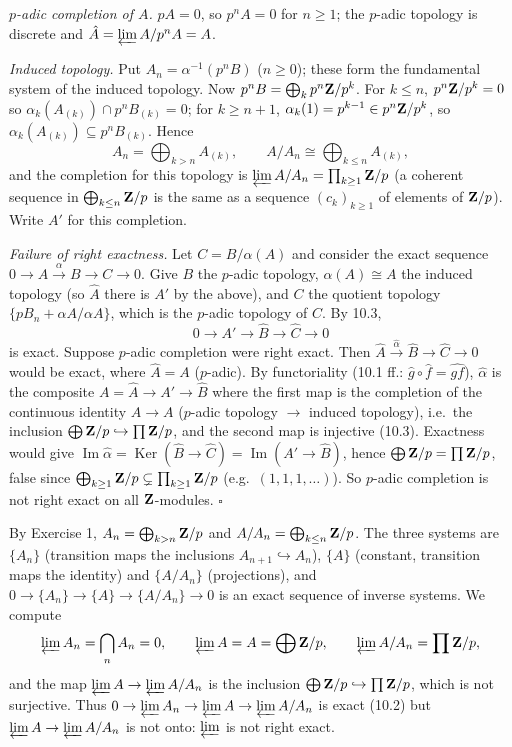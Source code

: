 \documentclass[11pt]{article}
\begin{document}
\emph{$p$-adic completion of $A$.} $pA=0$, so $p^nA=0$ for $n\ge1$; the $p$-adic topology is discrete and $\hat A=\varprojlim A/p^nA=A$.

\emph{Induced topology.} Put $A_n=\alpha^{-1}(p^nB)$ ($n\ge0$); these form the fundamental system of the induced topology. Now $p^nB=\bigoplus_kp^n\mathbf Z/p^k$. For $k\le n$, $p^n\mathbf Z/p^k=0$ so $\alpha_k(A_{(k)})\cap p^nB_{(k)}=0$; for $k\ge n+1$, $\alpha_k(1)=p^{k-1}\in p^n\mathbf Z/p^k$, so $\alpha_k(A_{(k)})\subseteq p^nB_{(k)}$. Hence
\[
A_n=\bigoplus_{k>n}A_{(k)},\qquad A/A_n\cong\bigoplus_{k\le n}A_{(k)},
\]
and the completion for this topology is $\varprojlim A/A_n=\prod_{k\ge1}\mathbf Z/p$ (a coherent sequence in $\bigoplus_{k\le n}\mathbf Z/p$ is the same as a sequence $(c_k)_{k\ge1}$ of elements of $\mathbf Z/p$). Write $A'$ for this completion.

\emph{Failure of right exactness.} Let $C=B/\alpha(A)$ and consider the exact sequence $0\to A\xrightarrow{\alpha}B\to C\to0$. Give $B$ the $p$-adic topology, $\alpha(A)\cong A$ the induced topology (so $\hat{A}$ there is $A'$ by the above), and $C$ the quotient topology $\{pB_n+\alpha A/\alpha A\}$, which is the $p$-adic topology of $C$. By 10.3,
\[
0\to A'\to\hat B\to\hat C\to0
\]
is exact. Suppose $p$-adic completion were right exact. Then $\hat A\xrightarrow{\hat\alpha}\hat B\to\hat C\to0$ would be exact, where $\hat A=A$ ($p$-adic). By functoriality (10.1 ff.: $\hat g\circ\hat f=\widehat{gf}$), $\hat\alpha$ is the composite $A=\hat A\to A'\to\hat B$ where the first map is the completion of the continuous identity $A\to A$ ($p$-adic topology $\to$ induced topology), i.e.\ the inclusion $\bigoplus\mathbf Z/p\hookrightarrow\prod\mathbf Z/p$, and the second map is injective (10.3). Exactness would give $\operatorname{Im}\hat\alpha=\operatorname{Ker}(\hat B\to\hat C)=\operatorname{Im}(A'\to\hat B)$, hence $\bigoplus\mathbf Z/p=\prod\mathbf Z/p$, false since $\bigoplus_{k\ge1}\mathbf Z/p\subsetneq\prod_{k\ge1}\mathbf Z/p$ (e.g.\ $(1,1,1,\dots)$). So $p$-adic completion is not right exact on all $\mathbf Z$-modules. \hfill$\square$

\pf
By Exercise 1, $A_n=\bigoplus_{k>n}\mathbf Z/p$ and $A/A_n=\bigoplus_{k\le n}\mathbf Z/p$. The three systems are $\{A_n\}$ (transition maps the inclusions $A_{n+1}\hookrightarrow A_n$), $\{A\}$ (constant, transition maps the identity) and $\{A/A_n\}$ (projections), and $0\to\{A_n\}\to\{A\}\to\{A/A_n\}\to0$ is an exact sequence of inverse systems. We compute
\[
\varprojlim A_n=\bigcap_nA_n=0,\qquad\varprojlim A=A=\bigoplus\mathbf Z/p,\qquad\varprojlim A/A_n=\prod\mathbf Z/p,
\]
and the map $\varprojlim A\to\varprojlim A/A_n$ is the inclusion $\bigoplus\mathbf Z/p\hookrightarrow\prod\mathbf Z/p$, which is not surjective. Thus $0\to\varprojlim A_n\to\varprojlim A\to\varprojlim A/A_n$ is exact (10.2) but $\varprojlim A\to\varprojlim A/A_n$ is not onto: $\varprojlim$ is not right exact.
\end{document}
